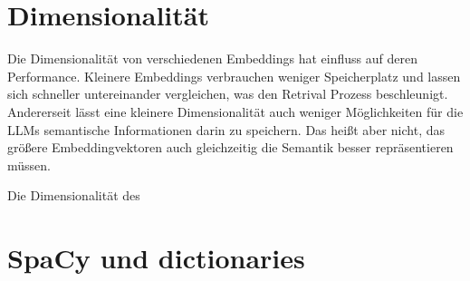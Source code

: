 \section{Dimensionalität}

Die Dimensionalität von verschiedenen Embeddings hat einfluss auf deren Performance.
Kleinere Embeddings verbrauchen weniger Speicherplatz und lassen sich schneller untereinander vergleichen, was den Retrival Prozess beschleunigt.
Andererseit lässt eine kleinere Dimensionalität auch weniger Möglichkeiten für die LLMs semantische Informationen darin zu speichern.
Das heißt aber nicht, das größere Embeddingvektoren auch gleichzeitig die Semantik besser repräsentieren müssen.

Die Dimensionalität des 

\section{SpaCy und dictionaries}
